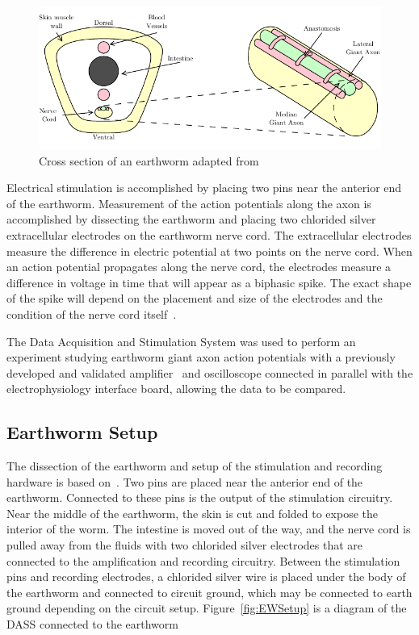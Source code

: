 \begin{figure}[H]
	\begin{singlespace}
	\centering 
		\includegraphics{./figures/EWCrossSec} 
	\caption{Cross section of an earthworm adapted from~\cite{KuehJellies,Kladt2010}\label{fig:EWCrossSec}}
	\end{singlespace}
\end{figure}


Electrical stimulation is accomplished by placing two pins near the anterior end of the earthworm.  Measurement of the action potentials along the axon is accomplished by dissecting the earthworm and placing two chlorided silver extracellular electrodes on the earthworm nerve cord.  The extracellular electrodes measure the difference in electric potential at two points on the nerve cord.  When an action potential propagates along the nerve cord, the electrodes measure a difference in voltage in time that will appear as a biphasic spike.  The exact shape of the spike will depend on the placement and size of the electrodes and the condition of the nerve cord itself~\cite{Olivo,KuehJellies,McGillCAP}.

The Data Acquisition and Stimulation System was used to perform an experiment studying earthworm giant axon action potentials with a previously developed and validated amplifier~\cite{StahlMSEE} and oscilloscope connected in parallel with the electrophysiology interface board, allowing the data to be compared.

\subsection{Earthworm Setup}

The dissection of the earthworm and setup of the stimulation and recording hardware is based on~\cite{Olivo,KuehJellies,StahlMSEE}.  Two pins are placed near the anterior end of the earthworm.  Connected to these pins is the output of the stimulation circuitry. Near the middle of the earthworm, the skin is cut and folded to expose the interior of the worm.  The intestine is moved out of the way, and the nerve cord is pulled away from the fluids with two chlorided silver electrodes that are connected to the amplification and recording circuitry. Between the stimulation pins and recording electrodes, a chlorided silver wire is placed under the body of the earthworm and connected to circuit ground, which may be connected to earth ground depending on the circuit setup.  Figure~\ref{fig:EWSetup} is a diagram of the DASS connected to the earthworm

